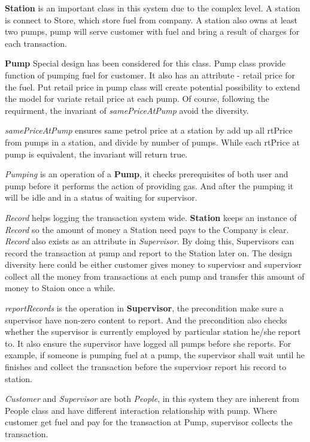 \textbf{Station} is an important class in this system due to the complex level. A station is connect to Store, which store fuel from company. A station also owns at least two pumps, pump will serve customer with fuel and bring a result of charges for each transaction.

\textbf{Pump} Special design has been considered for this class. Pump class provide function of pumping fuel for customer. It also has an attribute - retail price for the fuel. Put retail price in pump class will create potential possibility to extend the model for variate retail price at each pump. Of course, following the requirment, the invariant of \textit{samePriceAtPump} avoid the diversity. 

\textit{samePriceAtPump} ensures same petrol price at a station by add up all rtPrice from pumps in a station, and divide by number of pumps. While each rtPrice at pump is equivalent, the invariant will return true.

\textit{Pumping} is an operation of a \textbf{Pump}, it checks prerequisites of both user and pump before it performs the action of providing gas. And after the pumping it will be idle and in a status of waiting for supervisor.

\textit{Record} helps logging the transaction system wide.\textbf{ Station} keeps an instance of \textit{Record} so the amount of money a Station need pays to the Company is clear. \textit{Record} also exists as an attribute in \textit{Supervisor}. By doing this, Supervisors can record the transaction at pump and report to the Station later on. The design diversity here could be either customer gives money to superviosr and superviosr collect all the money from transactions at each pump and transfer this amount of money to Staion once a while. 

\textit{reportRecords} is the operation in  \textbf{Supervisor}, the precondition make sure a supervisor have non-zero content to report. And the precondition also checks whether the supervisor is currently employed by particular station he/she report to. It also ensure the supervisor have logged all pumps before she reports. For example, if someone is pumping fuel at a pump, the supervisor shall wait until he finishes and collect the transaction before the superviosr report his record to station. 

\textit{Customer} and \textit{Supervisor} are both \textit{People}, in this system they are inherent from People class and have different interaction relationship with pump. Where customer get fuel and pay for the transaction at Pump, supervisor collects the transaction.

